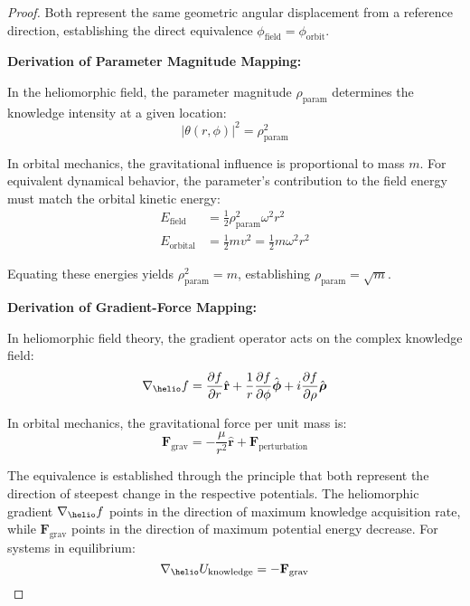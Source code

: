 \begin{proof}
Both represent the same geometric angular displacement from a reference direction, establishing the direct equivalence $\phi_{\text{field}} = \phi_{\text{orbit}}$.

\textbf{Derivation of Parameter Magnitude Mapping:}

In the heliomorphic field, the parameter magnitude $\rho_{\text{param}}$ determines the knowledge intensity at a given location:
\begin{equation}
|\theta(r,\phi)|^2 = \rho_{\text{param}}^2
\end{equation}

In orbital mechanics, the gravitational influence is proportional to mass $m$. For equivalent dynamical behavior, the parameter's contribution to the field energy must match the orbital kinetic energy:
\begin{align}
E_{\text{field}} &= \frac{1}{2}\rho_{\text{param}}^2 \omega^2 r^2 \\
E_{\text{orbital}} &= \frac{1}{2}m v^2 = \frac{1}{2}m \omega^2 r^2
\end{align}

Equating these energies yields $\rho_{\text{param}}^2 = m$, establishing $\rho_{\text{param}} = \sqrt{m}$.

\textbf{Derivation of Gradient-Force Mapping:}

In heliomorphic field theory, the gradient operator acts on the complex knowledge field:
\begin{equation}
\nabla_{\helio}f = \frac{\partial f}{\partial r}\hat{\mathbf{r}} + \frac{1}{r}\frac{\partial f}{\partial \phi}\hat{\boldsymbol{\phi}} + i\frac{\partial f}{\partial \rho}\hat{\boldsymbol{\rho}}
\end{equation}

In orbital mechanics, the gravitational force per unit mass is:
\begin{equation}
\mathbf{F}_{\text{grav}} = -\frac{\mu}{r^2}\hat{\mathbf{r}} + \mathbf{F}_{\text{perturbation}}
\end{equation}

The equivalence is established through the principle that both represent the direction of steepest change in the respective potentials. The heliomorphic gradient $\nabla_{\helio}f$ points in the direction of maximum knowledge acquisition rate, while $\mathbf{F}_{\text{grav}}$ points in the direction of maximum potential energy decrease. For systems in equilibrium:
\begin{equation}
\nabla_{\helio}U_{\text{knowledge}} = -\mathbf{F}_{\text{grav}}
\end{equation}


\end{proof}
